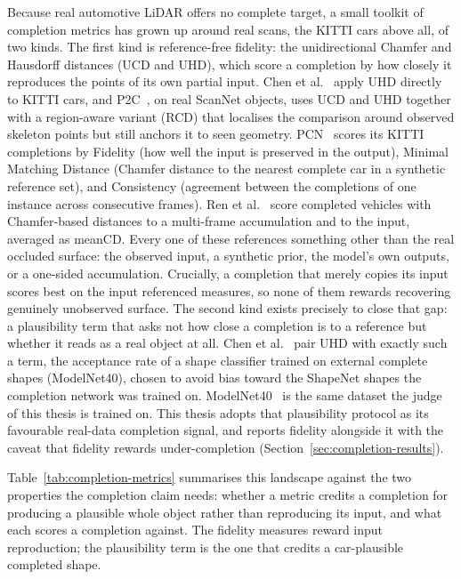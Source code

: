 Because real automotive LiDAR offers no complete target, a small toolkit of
completion metrics has grown up around real scans, the KITTI cars above all, of two kinds. The first kind is
reference-free fidelity: the unidirectional Chamfer and Hausdorff distances
(UCD and UHD), which score a completion by how closely it reproduces the points of its
own partial input. Chen et al.~\cite{chen2020unpaired} apply UHD directly to KITTI cars,
and P2C~\cite{cui2023p2c}, on real ScanNet objects, uses UCD and UHD together with a region-aware variant (RCD) that
localises the comparison around observed skeleton points but still anchors it to seen
geometry. PCN~\cite{yuan2019pcnpointcompletionnetwork} scores its KITTI completions by
Fidelity (how well the input is preserved in the output), Minimal Matching
Distance (Chamfer distance to the nearest complete car in a synthetic reference set), and
Consistency (agreement between the completions of one instance across consecutive
frames). Ren et al.~\cite{ren2022selfsupervised} score completed vehicles with Chamfer-based
distances to a multi-frame accumulation and to the input, averaged as meanCD. Every one of
these references
something other than the real occluded surface: the observed input, a synthetic prior,
the model's own outputs, or a one-sided accumulation. Crucially, a completion that
merely copies its input scores best on the input referenced measures, so none of
them rewards recovering genuinely unobserved surface. The second kind exists precisely to
close that gap: a plausibility term that asks not how close a completion is to a
reference but whether it reads as a real object at all. Chen et
al.~\cite{chen2020unpaired} pair UHD with exactly such a term, the acceptance rate of a
shape classifier trained on external complete shapes (ModelNet40), chosen to avoid bias
toward the ShapeNet shapes the completion network was trained on. ModelNet40~\cite{wu2015modelnet}
is the same dataset the judge of this thesis is trained on. This thesis adopts that
plausibility protocol as its favourable real-data completion signal, and reports fidelity
alongside it with the caveat that fidelity rewards under-completion
(Section~\ref{sec:completion-results}).

Table~\ref{tab:completion-metrics} summarises this landscape against the two properties
the completion claim needs: whether a metric credits a completion for producing a
plausible whole object rather than reproducing its input, and what each scores a
completion against. The fidelity measures reward input reproduction; the plausibility
term is the one that credits a car-plausible completed shape.

